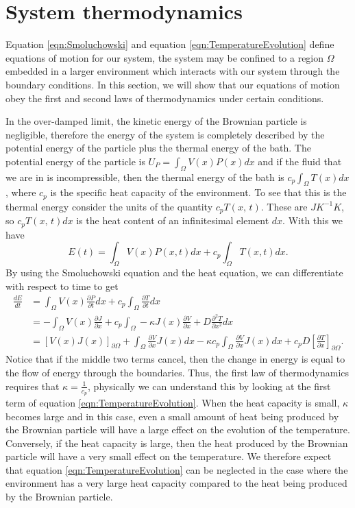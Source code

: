\section{System thermodynamics} \label{thermodynamics}
Equation \ref{eqn:Smoluchowski} and equation \ref{eqn:TemperatureEvolution} define equations of motion for our system, the system may be confined to a region $\Omega$ embedded in a larger environment which interacts with our system through the boundary conditions. In this section, we will show that our equations of motion obey the first and second laws of thermodynamics under certain conditions.

In the over-damped limit, the kinetic energy of the Brownian particle is negligible, therefore the energy of the system is completely described by the potential energy of the particle plus the thermal energy of the bath. The potential energy of the particle is $U_P = \int_{\Omega} V(x) P(x) dx$ and if the fluid that we are in is incompressible, then the thermal energy of the bath is $c_p \int_{\Omega} T(x) dx$, where $c_p$ is the specific heat capacity of the environment. To see that this is the thermal energy consider the units of the quantity $c_p T(x, \, t)$. These are $J K^{-1} K$, so $c_p T(x, \, t) dx$ is the heat content of an infinitesimal element $dx$. With this we have
\begin{equation}
E(t) = \int_{\Omega} V(x)P(x, t) dx + c_p \int_{\Omega} T(x, t) dx.
\end{equation}
By using the Smoluchowski equation and the heat equation, we can differentiate with respect to time to get
\begin{align}
\frac{d E}{d t} & = \int_{\Omega} V(x) \frac{\partial P}{\partial t} dx + c_p \int_{\Omega} \frac{\partial T}{\partial t} dx \\
 & = -\int_{\Omega} V(x) \frac{\partial J}{\partial x} + c_p \int_{\Omega} -\kappa J(x) \frac{\partial V}{\partial x} + D \frac{\partial^2 T}{\partial x^2} dx \\
 & = [V(x)J(x)]_{\partial \Omega}+ \int_{\Omega} \frac{\partial V}{\partial x} J(x) dx - \kappa c_p \int_{\Omega} \frac{\partial V}{\partial x} J(x) dx + c_p D \left [\frac{\partial T}{\partial x} \right]_{\partial \Omega}.
\end{align}
Notice that if the middle two terms cancel, then the change in energy is equal to the flow of energy through the boundaries. Thus, the first law of thermodynamics requires that $\kappa = \frac{1}{c_p}$, physically we can understand this by looking at the first term of equation \ref{eqn:TemperatureEvolution}. When the heat capacity is small, $\kappa$ becomes large and in this case, even a small amount of heat being produced by the Brownian particle will have a large effect on the evolution of the temperature. Conversely, if the heat capacity is large, then the heat produced by the Brownian particle will have a very small effect on the temperature. We therefore expect that equation \ref{eqn:TemperatureEvolution} can be neglected in the case where the environment has a very large heat capacity compared to the heat being produced by the Brownian particle.

